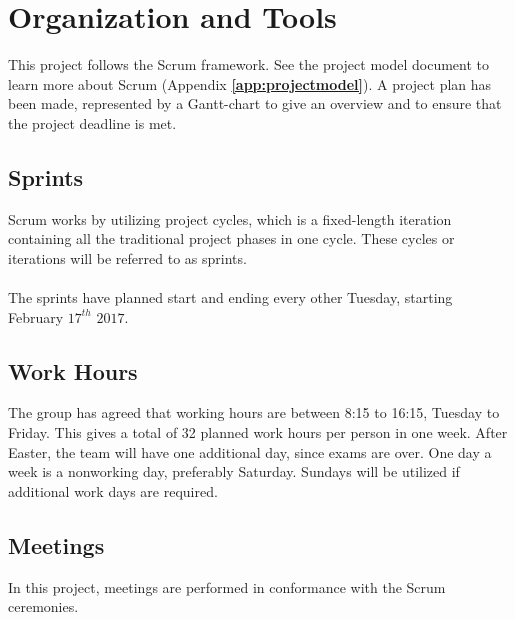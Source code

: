 \chapter{Organization and Tools}

This project follows the Scrum framework. See the project model document to learn more about Scrum (Appendix \textbf{\ref{app:projectmodel}}). A project plan has been made, represented by a Gantt-chart to give an overview and to ensure that the project deadline is met. 

\section{Sprints}

Scrum works by utilizing project cycles, which is a fixed-length iteration containing all the traditional project phases in one cycle. These cycles or iterations will be referred to as sprints.\\
\\
The sprints have planned start and ending every other Tuesday, starting February $17^{th}$ $2017$. 


\section{Work Hours}

The group has agreed that working hours are between 8:15 to 16:15, Tuesday to Friday. This gives a total of 32 planned work hours per person in one week. After Easter, the team will have one additional day, since exams are over. One day a week is a nonworking day, preferably Saturday. Sundays will be utilized if additional work days are required. 

\section{Meetings}

In this project, meetings are performed in conformance with the Scrum ceremonies.

